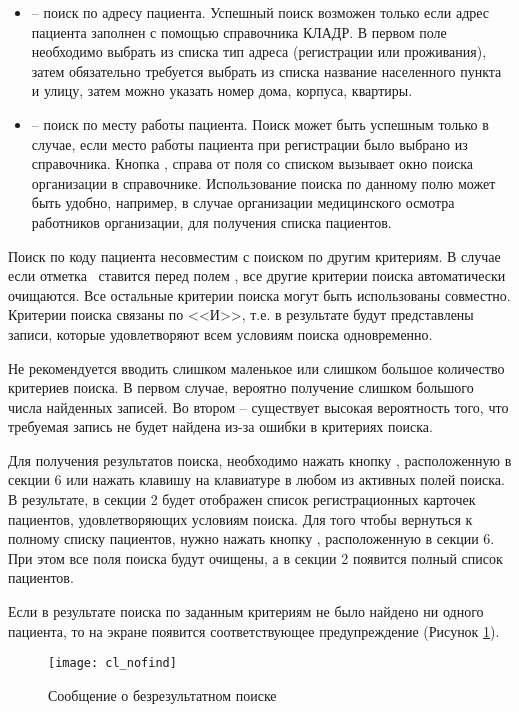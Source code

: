 \begin{itemize}
 \item	{} – поиск по адресу пациента. Успешный поиск возможен только если адрес пациента заполнен с помощью справочника КЛАДР. В первом поле необходимо выбрать из списка тип адреса (регистрации или проживания), затем обязательно требуется выбрать из списка название населенного пункта и улицу, затем можно указать номер дома, корпуса, квартиры.
 \item	{} – поиск по месту работы пациента. Поиск может быть успешным только в случае, если место работы пациента при регистрации было выбрано из справочника. Кнопка , справа от поля со списком вызывает окно поиска организации в справочнике. Использование поиска по данному полю может быть удобно, например, в случае организации медицинского осмотра работников организации, для получения списка пациентов.
\end{itemize}
 
Поиск по коду пациента несовместим с поиском по другим критериям. В случае если отметка \putx~ставится перед полем , все другие критерии поиска автоматически очищаются. Все остальные критерии поиска могут быть использованы совместно. Критерии поиска связаны по <<И>>, т.е. в результате будут представлены записи, которые удовлетворяют всем условиям поиска одновременно.


\begin{prim}
Не рекомендуется вводить слишком маленькое или слишком большое количество критериев поиска. В первом случае, вероятно получение слишком большого числа найденных записей. Во втором – существует высокая вероятность того, что требуемая запись не будет найдена из-за ошибки в критериях поиска.
\end{prim}
    
Для получения результатов поиска, необходимо нажать кнопку , расположенную в секции 6 или нажать клавишу  на клавиатуре в любом из активных полей поиска. В результате, в секции 2 будет отображен список регистрационных карточек пациентов, удовлетворяющих условиям поиска. Для того чтобы вернуться к полному списку пациентов, нужно нажать кнопку , расположенную в секции 6. При этом все поля поиска будут очищены, а в секции 2 появится полный список пациентов.

Если в результате поиска по заданным критериям не было найдено ни одного пациента, то на экране появится соответствующее предупреждение (Рисунок \ref{img_cl_nofind}). 

\begin{figure}[ht]\centering
 \texttt{[image: cl\_nofind]}
 \caption{Сообщение о безрезультатном поиске}
 \label{img_cl_nofind}
\end{figure} 

